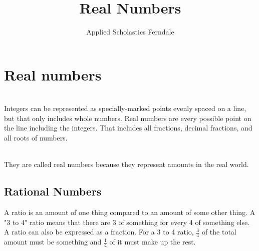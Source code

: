 \documentclass{article}
\title{Real Numbers}
\author{Applied Scholastics Ferndale}\\
\date{}
\begin{document}
\maketitle
\newpage

\large
\section*{Real numbers}

\vspace{16pt}
\\

Integers can be represented as specially-marked points evenly spaced on a line, but that only includes whole numbers. Real numbers are every possible point on the line including the integers. That includes all fractions, decimal fractions, and all roots of numbers.\\

\vspace{16pt}
\\

They are called real numbers because they represent amounts in the real world.\\

\newpage

\subsection*{Rational Numbers}

A ratio is an amount of one thing compared to an amount of some other thing. A "3 to 4" ratio means that there are 3 of something for every 4 of something else. A ratio can also be expressed as a fraction. For a 3 to 4 ratio, $\frac{3}{4}$ of the total amount must be something and $\frac{1}{4}$ of it must make up the rest.\\
\end{document}
